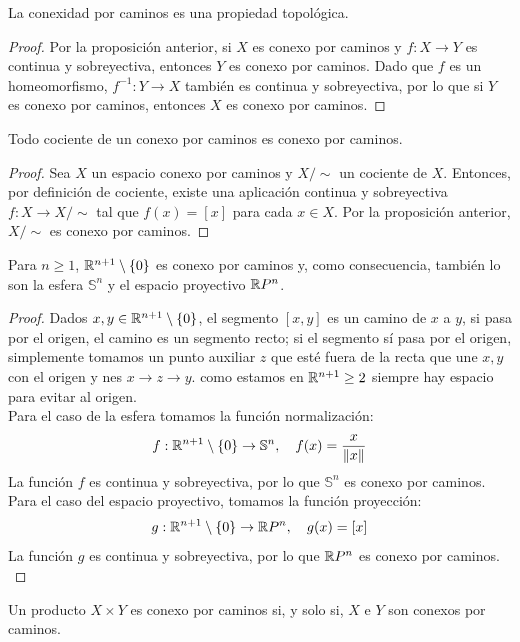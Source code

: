 \begin{corolario}
    La conexidad por caminos es una propiedad topológica.
\end{corolario}
\begin{proof}
    Por la proposición anterior, si $X$ es conexo por caminos y $f \colon X \to Y$ es continua y sobreyectiva, entonces $Y$ es conexo por caminos. Dado que $f$ es un homeomorfismo, $f^{-1} \colon Y \to X$ también es continua y sobreyectiva, por lo que si $Y$ es conexo por caminos, entonces $X$ es conexo por caminos.
\end{proof}
\begin{corolario}
    Todo cociente de un conexo por caminos es conexo por caminos.
\end{corolario}
\begin{proof}
    Sea $X$ un espacio conexo por caminos y $X/\sim$ un cociente de $X$. Entonces, por definición de cociente, existe una aplicación continua y sobreyectiva $f: X \to X/\sim$ tal que $f(x) = [x]$ para cada $x \in X$. Por la proposición anterior, $X/\sim$ es conexo por caminos.
\end{proof}
\begin{proposición}
    Para $n \geq 1$, $\mathbb{R}^{n+1} \setminus \{0\}$ es conexo por caminos y, como consecuencia, también lo son la esfera $\mathbb{S}^n$ y el espacio proyectivo $\mathbb{R} P^n$.
\end{proposición}
\begin{proof}
    Dados $x, y \in \mathbb{R}^{n+1} \setminus \{0\}$, el segmento $[x, y]$ es un camino de $x$ a $y$, si pasa por el origen, el camino es un segmento recto; si el segmento sí pasa por el origen, simplemente tomamos un punto auxiliar $z$ que esté fuera de la recta que une $x, y$ con el origen y nes $x \to z \to y$. como estamos en $\mathbb{R}^{n+1} \geq 2$ siempre hay espacio para evitar al origen. \\
    Para el caso de la esfera tomamos la función normalización: 
    $$f: \mathbb{R}^{n+1} \setminus \{0\} \to \mathbb{S}^n, \quad f(x) = \frac{x}{\|x\|}$$
    La función $f$ es continua y sobreyectiva, por lo que $\mathbb{S}^n$ es conexo por caminos. Para el caso del espacio proyectivo, tomamos la función proyección:
    $$g: \mathbb{R}^{n+1} \setminus \{0\} \to \mathbb{R} P^n, \quad g(x) = [x]$$
    La función $g$ es continua y sobreyectiva, por lo que $\mathbb{R} P^n$ es conexo por caminos. \\ 
\end{proof}
\begin{proposición}
    Un producto $X \times Y$ es conexo por caminos si, y solo si, $X$ e $Y$ son conexos por caminos.
\end{proposición}
